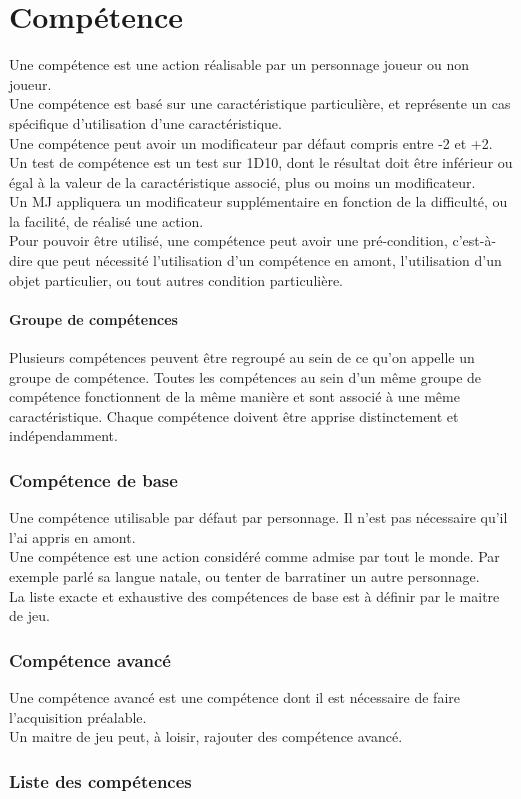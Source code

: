 \part{Compétence}

Une compétence est une action réalisable par un personnage joueur ou non joueur. \\
Une compétence est basé sur une caractéristique particulière, et représente un cas spécifique d'utilisation d'une caractéristique. \\
Une compétence peut avoir un modificateur par défaut compris entre -2 et +2. \\
Un test de compétence est un test sur 1D10, dont le résultat doit être inférieur ou égal à la valeur de la caractéristique associé, plus ou moins un modificateur. \\
Un MJ appliquera un modificateur supplémentaire en fonction de la difficulté, ou la facilité, de réalisé une action. \\
Pour pouvoir être utilisé, une compétence peut avoir une pré-condition, c'est-à-dire que peut nécessité l'utilisation d'un compétence en amont, l'utilisation d'un objet particulier, ou tout autres condition particulière.

\subsection{Groupe de compétences}
Plusieurs compétences peuvent être regroupé au sein de ce qu'on appelle un groupe de compétence. Toutes les compétences au sein d'un même groupe de compétence fonctionnent de la même manière et sont associé à une même caractéristique. Chaque compétence doivent être apprise distinctement et indépendamment.

\section{Compétence de base}
Une compétence utilisable par défaut par personnage. Il n'est pas nécessaire qu'il l'ai appris en amont. \\
Une compétence est une action considéré comme admise par tout le monde. Par exemple parlé sa langue natale, ou tenter de barratiner un autre personnage. \\
La liste exacte et exhaustive des compétences de base est à définir par le maitre de jeu.
 
\section{Compétence avancé}
Une compétence avancé est une compétence dont il est nécessaire de faire l'acquisition préalable. \\
Un maitre de jeu peut, à loisir, rajouter des compétence avancé. \\ 

\section{Liste des compétences}
